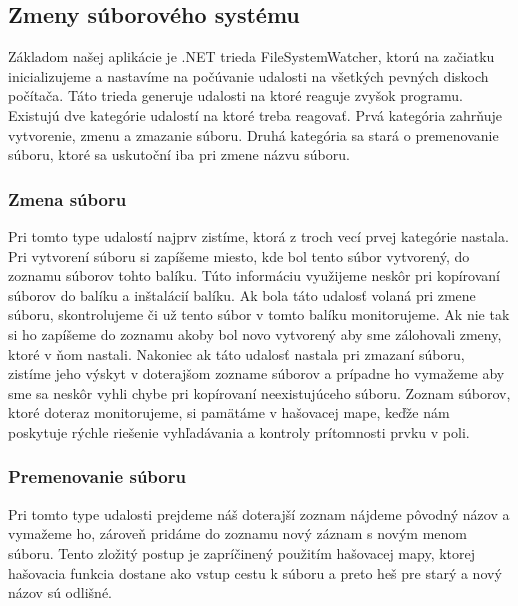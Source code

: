 \subsection{Zmeny súborového systému}
\label{subsec:fsw}
Základom našej aplikácie je .NET trieda FileSystemWatcher, ktorú na začiatku inicializujeme a nastavíme na počúvanie udalosti na všetkých pevných diskoch počítača. Táto trieda generuje udalosti na ktoré reaguje zvyšok programu. Existujú dve kategórie udalostí na ktoré treba reagovať. Prvá kategória zahrňuje vytvorenie, zmenu a zmazanie súboru. Druhá kategória sa stará o premenovanie súboru, ktoré sa uskutoční iba pri zmene názvu súboru. 

\subsubsection{Zmena súboru}
Pri tomto type udalostí najprv zistíme, ktorá z troch vecí prvej kategórie nastala. Pri vytvorení súboru si zapíšeme miesto, kde bol tento súbor vytvorený, do zoznamu súborov tohto balíku. Túto informáciu využijeme neskôr pri kopírovaní súborov do balíku a inštalácií balíku. Ak bola táto udalosť volaná pri zmene súboru, skontrolujeme či už tento súbor v tomto balíku monitorujeme. Ak nie tak si ho zapíšeme do zoznamu akoby bol novo vytvorený aby sme zálohovali zmeny, ktoré v ňom nastali. Nakoniec ak táto udalosť nastala pri zmazaní súboru, zistíme jeho výskyt v doterajšom zozname súborov a prípadne ho vymažeme aby sme sa neskôr vyhli chybe pri kopírovaní neexistujúceho súboru. Zoznam súborov, ktoré doteraz monitorujeme, si pamätáme v hašovacej mape, keďže nám poskytuje rýchle riešenie vyhľadávania a kontroly prítomnosti prvku v poli.

\subsubsection{Premenovanie súboru}
Pri tomto type udalosti prejdeme náš doterajší zoznam nájdeme pôvodný názov a vymažeme ho, zároveň pridáme do zoznamu nový záznam s novým menom súboru. Tento zložitý postup je zapríčinený použitím hašovacej mapy, ktorej hašovacia funkcia dostane ako vstup cestu k súboru a preto heš pre starý a nový názov sú odlišné.

